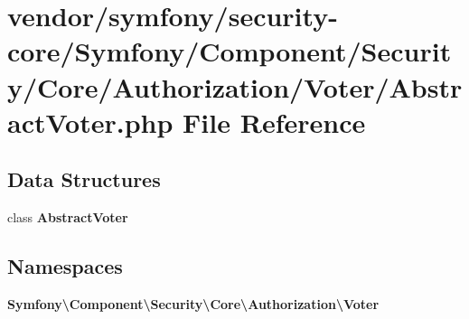 \section{vendor/symfony/security-\/core/\+Symfony/\+Component/\+Security/\+Core/\+Authorization/\+Voter/\+Abstract\+Voter.php File Reference}
\label{_abstract_voter_8php}
\subsection*{Data Structures}
\begin{DoxyCompactItemize}
\item 
class {\bf Abstract\+Voter}
\end{DoxyCompactItemize}
\subsection*{Namespaces}
\begin{DoxyCompactItemize}
\item 
 {\bf Symfony\textbackslash{}\+Component\textbackslash{}\+Security\textbackslash{}\+Core\textbackslash{}\+Authorization\textbackslash{}\+Voter}
\end{DoxyCompactItemize}
